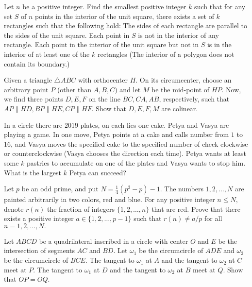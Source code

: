 \documentclass[11pt]{scrartcl}
\begin{document}
\begin{problem}[792975361721939]
	Let $n$ be a positive integer. Find the smallest positive integer $k$ such that for any set $S$ of $n$ points in the interior of the unit square, there exists a set of $k$ rectangles such that the following hold:
The sides of each rectangle are parallel to the sides of the unit square.
Each point in $S$ is not in the interior of any rectangle.
Each point in the interior of the unit square but not in $S$ is in the interior of at least one of the $k$ rectangles
(The interior of a polygon does not contain its boundary.)
\end{problem}
\begin{problem}[296367141382799]
Given a triangle $ \triangle{ABC} $ with orthocenter $ H $. On its circumcenter, choose an arbitrary point $ P $ (other than $ A,B,C $) and let $ M $ be the mid-point of $ HP $. Now, we find three points $ D,E,F $ on the line $ BC, CA, AB $, respectively, such that $ AP \parallel HD, BP \parallel HE, CP \parallel HF $. Show that $ D, E, F, M $ are colinear.
\end{problem}
\begin{problem}[813804034055493]
In a circle there are $2019$ plates, on each lies one cake. Petya and Vasya are playing a game. In one move, Petya points at a cake and calls number from $1$ to $16$, and Vasya moves the specified cake to the specified number of
check clockwise or counterclockwise (Vasya chooses the direction each time). Petya wants at least some $k$ pastries to accumulate on one of the plates and Vasya wants to stop him. What is the largest $k$ Petya can succeed?
\end{problem}
\begin{problem}[47893544380608]
	Let $p$ be an odd prime, and put $N=\frac{1}{4} (p^3 -p) -1.$ The numbers $1,2, \dots, N$ are painted arbitrarily in two colors, red and blue. For any positive integer $n \leqslant N,$ denote $r(n)$ the fraction of integers $\{ 1,2, \dots, n \}$ that are red.
Prove that there exists a positive integer $a \in \{ 1,2, \dots, p-1\}$ such that $r(n) \neq a/p$ for all $n = 1,2, \dots , N.$
\end{problem}
\begin{problem}[451078820354844]
	Let $ABCD$ be a quadrilateral inscribed in a circle with center $O$ and $E$ be the intersection of segments $AC$ and $BD$. Let $\omega_1$ be the circumcircle of $ADE$ and $\omega_2$ be the circumcircle of $BCE$. The tangent to $\omega_1$ at $A$ and the tangent to $\omega_2$ at $C$ meet at $P$. The tangent to $\omega_1$ at $D$ and the tangent to $\omega_2$ at $B$ meet at $Q$. Show that $OP=OQ$.
\end{problem}
\end{document}
